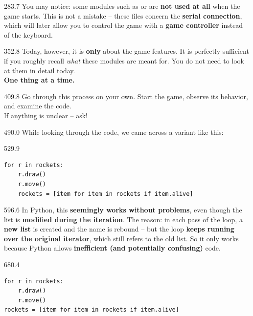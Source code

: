 \documentclass{aslab}
\begin{document}
\begin{region}[pitch=13.93]{283.7}
You may notice: some modules such as  or
 are \textbf{not used at all} when the game starts.
This is not a mistake -- these files concern the \textbf{serial connection},
which will later allow you to control the game with a \textbf{game
controller} instead of the keyboard.
\end{region}

\begin{region}[pitch=14.25]{352.8}
Today, however, it is \textbf{only} about the game features. It is perfectly
sufficient if you roughly recall \emph{what} these modules are meant for. You
do not need to look at them in detail today.\\
\textbf{One thing at a time.}
\end{region}

\begin{region}[pitch=13.23]{409.8}
Go through this process on your own. Start the game, observe its behavior, and
examine the code.\\
If anything is unclear -- ask!
\end{region}

\begin{region}[pitch=13.3]{490.0}
While looking through the code, we came across a variant like this:
\end{region}

\begin{region}[pitch=13.2]{529.9}
\begin{lstlisting}[style=plain]
for r in rockets:
    r.draw()
    r.move()
    rockets = [item for item in rockets if item.alive]
\end{lstlisting}
\end{region}

\begin{region}[pitch=14.28]{596.6}
In Python, this \textbf{seemingly works without problems}, even though the
list  is \textbf{modified during the iteration}. The reason: in
each pass of the loop, a \textbf{new list} is created and the name
 is rebound -- but the loop \textbf{keeps running over the
original iterator}, which still refers to the old list. So it only works
because Python allows \textbf{inefficient (and potentially confusing)} code.
\end{region}

\begin{region}[pitch=13.2]{680.4}
\begin{lstlisting}[style=plain]
for r in rockets:
    r.draw()
    r.move()
rockets = [item for item in rockets if item.alive]
\end{lstlisting}
\end{region}
\end{document}
